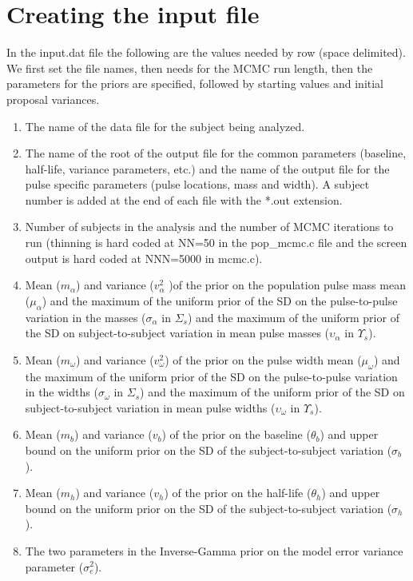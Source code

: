 \documentclass[12pt, oneside]{article}   	%
\begin{document}
\section{Creating the input file}
In the input.dat file the following are the values needed by row (space delimited). We first set the file names, then needs for the MCMC run length, then the parameters for the priors are specified, followed by starting values and initial proposal variances.
\begin{enumerate}
\item The name of the data file for the subject being analyzed.
\item The name of the root of the output file for the common parameters (baseline, half-life, variance parameters, etc.) and the name of the output file for the pulse specific parameters (pulse locations, mass and width). A subject number is added at the end of each file with the *.out extension.
\item Number of subjects in the analysis and the number of MCMC iterations to run (thinning is hard coded at NN=50 in the pop\_mcmc.c file and the screen output is hard coded at NNN=5000 in mcmc.c).
\item Mean ($m_\alpha$) and variance ($v_\alpha^2$ )of the prior on the population pulse mass mean ($\mu_\alpha$) and the maximum of the uniform prior of the SD on the pulse-to-pulse variation in the  masses ($\sigma_\alpha$ in $\Sigma_s$) and the maximum of the uniform prior of the SD on subject-to-subject variation in mean  pulse masses ($\upsilon_\alpha$ in $\Upsilon_s$).
\item Mean ($m_\omega$) and variance ($v_\omega^2$) of the prior on the pulse width mean ($\mu_\omega$) and the maximum of the uniform prior of the SD on the pulse-to-pulse variation in the  widths ($\sigma_\omega$ in $\Sigma_s$) and the maximum of the uniform prior of the SD on subject-to-subject variation in mean  pulse widths ($\upsilon_\omega$ in $\Upsilon_s$).
\item Mean ($m_b$) and variance ($v_b$) of the prior on the baseline ($\theta_b$) and upper bound on the uniform prior on the SD of the subject-to-subject variation ($\sigma_b$).
\item Mean ($m_h$) and variance ($v_h$) of the prior on the half-life ($\theta_h$) and upper bound on the uniform prior on the SD of the subject-to-subject variation ($\sigma_h$).
\item The two parameters in the Inverse-Gamma prior on the model error variance parameter ($\sigma_e^2$).

\end{enumerate}
\end{document}
